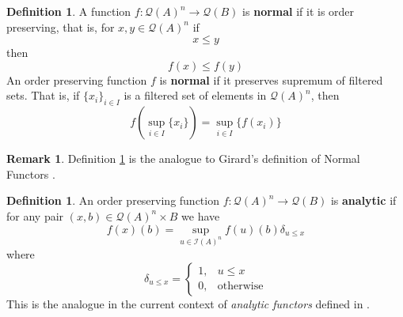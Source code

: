 \documentclass[12pt]{article}
\theoremstyle{plain}
\theoremstyle{definition}
\newtheorem{defn}[thm]{Definition} %
\newtheorem{remark}[thm]{Remark}
\newcommand{\call}[1]{\mathcal{#1}}
\newcommand{\Ical}{\call{I}}
\newcommand{\Qcal}{\call{Q}}
\newcommand{\lto}{\longrightarrow}
\begin{document}
	\begin{defn}\label{def:normal}
		A function $f: \Qcal(A)^n \lto \Qcal(B)$ is \textbf{normal} if it is order preserving, that is, for $x, y \in \Qcal(A)^n$ if
			\begin{equation}
				x \leq y
			\end{equation}
			then
			\begin{equation}
				f(x) \leq f(y)
			\end{equation}
		An order preserving function $f$ is \textbf{normal} if it preserves supremum of filtered sets. That is, if $\{ x_i \}_{i \in I}$ is a filtered set of elements in $\Qcal(A)^n$, then
			\begin{equation}
				f(\operatorname{sup}_{i \in I} \{ x_i \}) = \operatorname{sup}_{i \in I}\{ f(x_i) \}
			\end{equation}
	\end{defn}
	
	\begin{remark}
		Definition \ref{def:normal} is the analogue to Girard's definition of Normal Functors \cite[Definition 2.1]{Girard}.
	\end{remark}

\begin{defn}
	An order preserving function $f: \Qcal(A)^n \lto \Qcal(B)$ is \textbf{analytic} if for any pair $(x, b) \in \Qcal(A)^n \times B$ we have
	\begin{equation}
		f(x)(b) = \operatorname{sup}_{u \in \Ical(A)^n}f(u)(b)\delta_{u \leq x}
	\end{equation}
	where
	\begin{equation}
		\delta_{u \leq x} = 
		\begin{cases}
			1, & u \leq x\\
			0, & \text{otherwise}
		\end{cases}
	\end{equation}
	This is the analogue in the current context of \emph{analytic functors} defined in \cite[Definition 2.2]{Girard}. 
	\end{defn}
\end{document}
